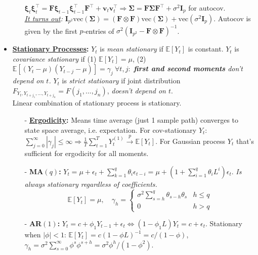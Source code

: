 \documentclass[9pt, landscape]{article}
\begin{document}
\begin{multicols*}{3}
\begin{itemize}
\begin{itemize}[leftmargin=10pt,noitemsep,topsep=0pt,partopsep=0pt]
		$\bm{\xi}_t \bm{\xi}_t^{\top} = \bm{F}\bm{\xi}_{t-1}\bm{\xi}_{t-1}^{\top} \bm{F}^{\top} + \bm{v}_t\bm{v}_t^{\top} \Rightarrow \bm{\Sigma} = \bm{F} \bm{\Sigma} \bm{F}^{\top} + \sigma^2 \bm{I}_p$ for autocov.\\
		\textit{\href{https://en.wikipedia.org/wiki/Vectorization_(mathematics)}{It turns out}:} $\bm{I}_{p^2}\text{vec}(\bm{\Sigma}) = ( \bm{F} \otimes \bm{F})\text{vec}(\bm{\Sigma}) + \text{vec}(\sigma^2\bm{I}_p)$. Autocov is given by the first $p$-entries of $\sigma^2 (\bm{I}_{p^2} - \bm{F} \otimes \bm{F})^{-1}$.
	\end{itemize}
	\item \textbf{\href{https://en.wikipedia.org/wiki/Stationary_process}{Stationary Processes}:} $Y_t$ is \textit{mean stationary} if $\mathbb{E}\left[Y_t\right]$ is constant. $Y_t$ is \textit{covariance stationary} if (1) $\mathbb{E}\left[Y_t\right] = \mu$, (2) $\mathbb{E}\left[(Y_t-\mu)(Y_{t-j}-\mu)\right] = \gamma_j~\forall t,j:$ \textit{\textbf{first and second moments} don't depend on $t$.} $Y_t$ is \textit{strict stationary} if joint distribution $F_{Y_t, Y_{t+j_1}, ..., Y_{t+j_n}} = F(j_1, ..., j_n)$, \textit{doesn't depend on $t$}. \\
	Linear combination of stationary process is stationary.
	\begin{itemize}[leftmargin=10pt,noitemsep,topsep=0pt,partopsep=0pt]
		\item[-] \textbf{\href{https://en.wikipedia.org/wiki/Ergodicity}{Ergodicity}:} Means time average (just 1 sample path) converges to state space average, i.e. expectation. For cov-stationary $Y_t$: $\sum_{j=0}^{\infty} |\gamma_j| \leq \infty \Rightarrow \frac{1}{T} \sum_{t=1}^T Y_{t}^{(1)} \xrightarrow{p} \mathbb{E}\left[Y_t\right]$. For Gaussian process $Y_t$ that's sufficient for ergodicity for all moments.
		\item[-] \textbf{MA$(q)$:} $Y_t = \mu + \epsilon_t + \sum_{k=1}^q \theta_i \epsilon_{t-i} = \mu + (1+\sum_{i=1}^q \theta_i L^i) \epsilon_t$. \textit{Is always stationary regardless of coefficients.}
		{\scriptsize$$
		\mathbb{E}\left[Y_t\right] = \mu, \quad
		\gamma_h = \begin{cases}
		\sigma^2 \sum_{s=h}^q \theta_{s-h} \theta_s & h \leq q \\
		0 & h > q
		\end{cases}
		$$}
		\item[-] \textbf{AR$(1)$:} $Y_t = c + \phi_1 Y_{t-1} + \epsilon_t \iff (1-\phi_1 L) Y_t = c+\epsilon_t$. Stationary when $|\phi|<1$: $\mathbb{E}\left[Y_t\right] = c(1-\phi L)^{-1} = c/(1-\phi)$, $\gamma_h = \sigma^2 \textstyle\sum_{s=0}^{\infty}\phi^s \phi^{s+h} = \sigma^2 \phi^h / (1-\phi^2)$.

\end{itemize}
\end{itemize}
\end{multicols*}
\end{document}
